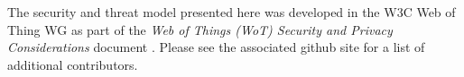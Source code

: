 The security and threat model presented here was developed 
in the W3C Web of Thing WG as part of the 
\textit{Web of Things (WoT) Security and Privacy Considerations} 
document \cite{Wot2017sec}. Please see the associated github site
for a list of additional contributors.
